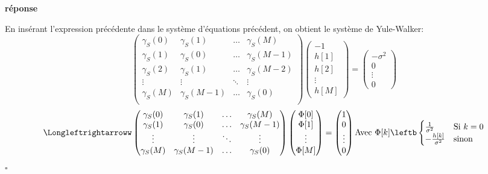 \documentclass{article}
\newcommand{\debutrep}[1]{\color{blue}\begin{center} \hrulefill \textbf{ #1 } \hrulefill \end{center} }
\newcommand{\finrep}{\vspace*{5mm}\hfill $\square$\color{black}\vspace*{5mm}}
\begin{document}
\debutrep{réponse}
En insérant l'expression précédente dans le système d'équations précédent, on obtient le système de Yule-Walker:
\[
\begin{pmatrix}
\gamma_S(0) & \gamma_S(1) & \hdots & \gamma_S(M) \\
\gamma_S(1) & \gamma_S(0) & \hdots & \gamma_S(M-1) \\
\gamma_S(2) & \gamma_S(1) & \hdots & \gamma_S(M-2) \\
\vdots & \vdots & \ddots & \vdots \\
\gamma_S(M) & \gamma_S(M-1) & \hdots & \gamma_S(0) \\
\end{pmatrix}
\begin{pmatrix}
-1 \\ h[1] \\ h[2] \\ \vdots \\ h[M]
\end{pmatrix}
=
\begin{pmatrix}
-\sigma^2 \\ 0 \\ \vdots \\ 0
\end{pmatrix}
\]
\[
\Longleftrightarroww
\begin{pmatrix}
\gamma_S(0) & \gamma_S(1) & \hdots & \gamma_S(M) \\
\gamma_S(1) & \gamma_S(0) & \hdots & \gamma_S(M-1) \\
\vdots & \vdots & \ddots & \vdots \\
\gamma_S(M) & \gamma_S(M-1) & \hdots & \gamma_S(0) \\
\end{pmatrix}
\begin{pmatrix}
\Phi[0] \\ \Phi[1] \\ \vdots \\ \Phi[M]
\end{pmatrix}
=
\begin{pmatrix}
1 \\ 0 \\ \vdots \\ 0
\end{pmatrix}
\text{Avec }
\Phi[k]
\leftb
\begin{cases}
    \frac{1}{\sigma^2}    & \text{Si } k = 0 \\
    -\frac{h[k]}{\sigma^2} & \text{sinon}
\end{cases}
\]
\finrep
\end{document}
